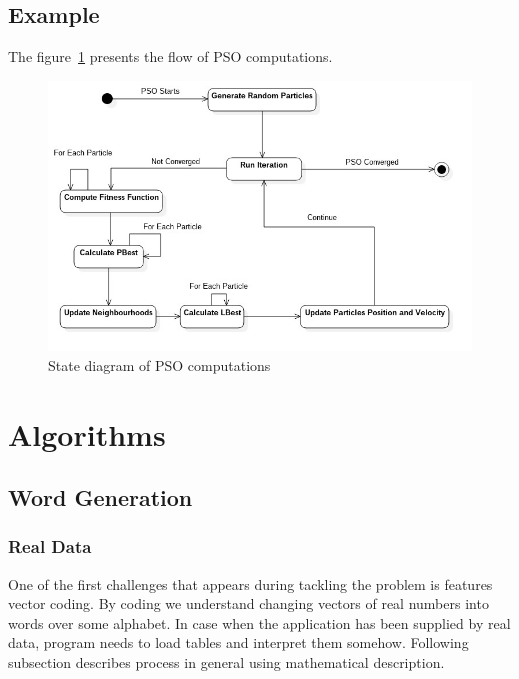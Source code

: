 \documentclass{mini}
\begin{document}
\section{Example}
The figure~\ref{fig:pso_state} presents the flow of PSO computations.
\begin{figure}
\includegraphics[width=1.0\textwidth]{../uml/states/pso.jpg}
\caption{State diagram of PSO computations}
\label{fig:pso_state}
\end{figure}


\chapter{Algorithms} \label{sec:algorithms}


\section{Word Generation} \label{section:word_gen}

\subsection{Real Data} \label{section:word_gen_real}
One of the first challenges that appears during tackling the problem is features vector coding. By coding we understand changing vectors of real numbers into words over some alphabet. In case when the application has been supplied by real data, program needs to load tables and interpret them somehow. Following subsection describes process in general using mathematical description.
\end{document}
